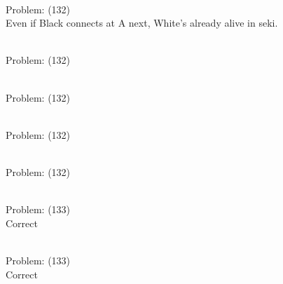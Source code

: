\documentclass[11pt]{article}
\begin{document}
\begin{minipage}[t]{0.5\textwidth}
  {\centering
  
\\
Problem: (132)\\
Even if Black connects at A next, White's already alive in seki.\\
  }
\end{minipage}
\begin{minipage}[t]{0.5\textwidth}
  {\centering
  
\\
Problem: (132)\\
  }
\end{minipage}
\begin{minipage}[t]{0.5\textwidth}
  {\centering
  
\\
Problem: (132)\\
  }
\end{minipage}
\begin{minipage}[t]{0.5\textwidth}
  {\centering
  
\\
Problem: (132)\\
  }
\end{minipage}
\begin{minipage}[t]{0.5\textwidth}
  {\centering
  
\\
Problem: (132)\\
  }
\end{minipage}
\begin{minipage}[t]{0.5\textwidth}
  {\centering
  
\\
Problem: (133)\\
Correct\\
  }
\end{minipage}
\begin{minipage}[t]{0.5\textwidth}
  {\centering
  
\\
Problem: (133)\\
Correct\\
  }
\end{minipage}
\end{document}
